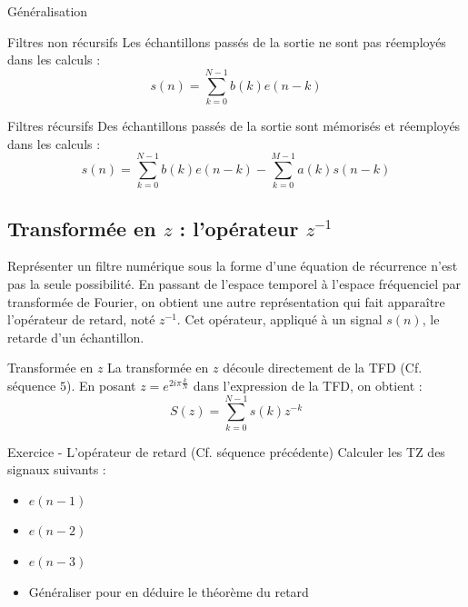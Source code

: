 \documentclass{beamer}
\newcounter{exampleBlockCounter}
\begin{document}
\begin{frame}{Généralisation}
\begin{block}{Filtres non récursifs}
\justify Les échantillons passés de la sortie ne sont pas réemployés dans les
calculs :
$$
s(n)=\sum_{k=0}^{N-1}b(k)e(n-k)
$$
\end{block}
\pause
\begin{block}{Filtres récursifs}
\justify Des échantillons passés de la sortie sont mémorisés et réemployés dans
les calculs :
$$
s(n)=\sum_{k=0}^{N-1}b(k)e(n-k) - \sum_{k=0}^{M-1}a(k)s(n-k)
$$ 
\end{block}
\end{frame}

\subsection{Transformée en $z$ : l'opérateur $z^{-1}$}

\begin{frame}
\justify Représenter un filtre numérique sous la forme d'une équation de
récurrence n'est pas la seule possibilité. En passant de l'espace temporel à
l'espace fréquenciel par transformée de Fourier, on obtient une autre
représentation qui fait apparaître l'opérateur de retard, noté $z^{-1}$. Cet
opérateur, appliqué à un signal $s(n)$, le retarde d'un échantillon.
\pause
\begin{block}{Transformée en $z$}
\justify La transformée en $z$ découle directement de la TFD (Cf. séquence $5$).
En posant $z=e^{2i\pi\frac{k}{N}}$ dans l'expression de la TFD, on obtient :
$$
S(z) = \sum_{k=0}^{N-1}s(k)z^{-k}
$$
\end{block}
\end{frame}

\begin{frame}
\begin{exampleblock}{Exercice  - L'opérateur de retard (Cf. séquence précédente)}
	\justifying
	Calculer les TZ des signaux suivants :
\begin{itemize}
	\item $e(n-1)$
	\item $e(n-2)$
	\item $e(n-3)$
	\item Généraliser pour en déduire le théorème du retard
\end{itemize}	
\end{exampleblock}
\end{frame}
\end{document}
